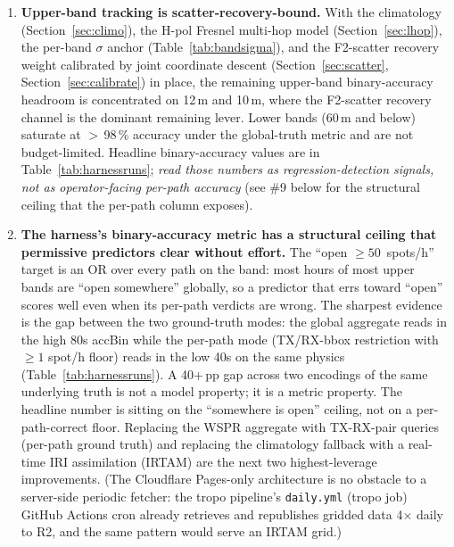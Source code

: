 \documentclass[11pt,a4paper]{article}
\begin{document}
\begin{enumerate}[leftmargin=*]
  \item \textbf{Upper-band tracking is scatter-recovery-bound.}
        With the climatology (Section~\ref{sec:climo}), the
        H-pol Fresnel multi-hop model (Section~\ref{sec:lhop}), the
        per-band $\sigma$ anchor (Table~\ref{tab:bandsigma}), and the
        F2-scatter recovery weight calibrated by joint coordinate
        descent (Section~\ref{sec:scatter}, Section~\ref{sec:calibrate})
        in place,
        the remaining upper-band binary-accuracy headroom is
        concentrated on
        12\,m and 10\,m, where the F2-scatter recovery channel is
        the dominant remaining lever.  Lower bands (60\,m and
        below) saturate at $>$\,98\,\% accuracy under the
        global-truth metric and are not budget-limited.  Headline
        binary-accuracy values are in
        Table~\ref{tab:harnessruns}; \emph{read those numbers as
        regression-detection signals, not as operator-facing
        per-path accuracy} (see \#9 below for the structural
        ceiling that the per-path column exposes).

  \item \textbf{The harness's binary-accuracy metric has a structural
        ceiling that permissive predictors clear without effort.}
        The ``open $\geq\!50$~spots/h'' target is an OR over every
        path on the band: most hours of most upper bands are ``open
        somewhere'' globally, so a predictor that errs toward ``open''
        scores well even when its per-path verdicts are wrong.  The
        sharpest evidence is the gap between the two ground-truth
        modes: the
        global aggregate reads in the high 80s
        accBin while the per-path mode (TX/RX-bbox restriction with
        $\geq\!1$ spot/h floor) reads in the low 40s on the same
        physics (Table~\ref{tab:harnessruns}).  A 40+\,pp gap
        across two
        encodings of the same underlying truth is not a model
        property; it is a metric property.  The headline number is
        sitting on the ``somewhere is open'' ceiling, not on a
        per-path-correct floor.  Replacing the WSPR aggregate with
        TX-RX-pair queries (per-path ground truth) and replacing the
        climatology fallback with a real-time IRI assimilation
        (IRTAM) are the next two highest-leverage improvements.
        (The Cloudflare Pages-only
        architecture is no obstacle to a server-side periodic
        fetcher: the tropo pipeline's
        \texttt{daily.yml} (tropo job) GitHub Actions cron already
        retrieves and republishes gridded data 4$\times$ daily to
        R2, and the same pattern would serve an IRTAM grid.)


\end{enumerate}
\end{document}
